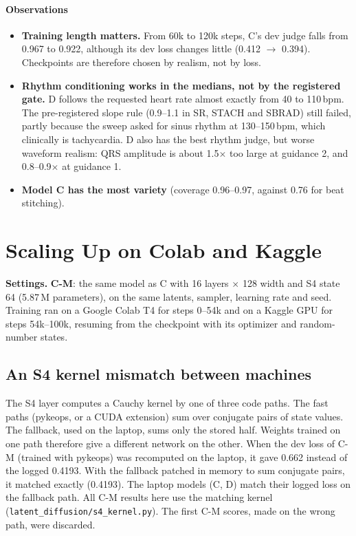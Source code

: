 \documentclass[11pt,a4paper]{article}
\newcommand{\obs}{\paragraph{Observations}}
\newcommand{\settings}[1]{\noindent\textbf{Settings.} #1\par\medskip}
\begin{document}
\obs
\begin{itemize}
\item \textbf{Training length matters.} From 60k to 120k steps, C's dev judge falls from 0.967 to 0.922, although its
  dev loss changes little (0.412 $\rightarrow$ 0.394). Checkpoints are therefore chosen by realism, not by loss.
\item \textbf{Rhythm conditioning works in the medians, not by the registered gate.} D follows the requested heart
  rate almost exactly from 40 to 110\,bpm. The pre-registered slope rule (0.9--1.1 in SR, STACH and SBRAD) still
  failed, partly because the sweep asked for sinus rhythm at 130--150\,bpm, which clinically is tachycardia. D also has the best
  rhythm judge, but worse waveform realism: QRS amplitude is about 1.5$\times$ too large at guidance 2, and 0.8--0.9$\times$ at
  guidance 1.
\item \textbf{Model C has the most variety} (coverage 0.96--0.97, against 0.76 for beat stitching).
\end{itemize}

\section{Scaling Up on Colab and Kaggle}\label{sec:scale}
\settings{\textbf{C-M}: the same model as C with 16 layers $\times$ 128 width and S4 state 64 (5.87\,M parameters),
on the same latents, sampler, learning rate and seed. Training ran on a Google Colab T4 for steps 0--54k and on a Kaggle GPU for steps 54k--100k, resuming from the
checkpoint with its optimizer and random-number states.}

\subsection{An S4 kernel mismatch between machines}
The S4 layer computes a Cauchy kernel by one of three code paths. The fast paths (pykeops, or a CUDA extension) sum
over conjugate pairs of state values. The fallback, used on the laptop, sums only the stored half. Weights trained on
one path therefore give a different network on the other. When the dev loss of C-M (trained with pykeops) was
recomputed on the laptop, it gave 0.662 instead of the logged 0.4193. With the fallback patched in memory to sum
conjugate pairs, it matched exactly (0.4193). The laptop models (C, D) match their logged loss on the fallback path.
All C-M results here use the matching kernel (\texttt{latent\_diffusion/s4\_kernel.py}). The first C-M scores, made on
the wrong path, were discarded.
\end{document}
